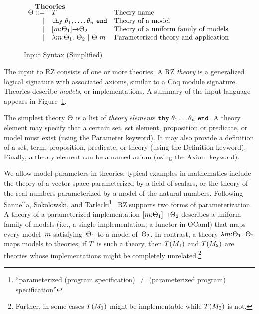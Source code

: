 \begin{figure}
\[\begin{array}{rl@{\quad}l}
  		\noalign{\textbf{Theories}}
		\ith ::= 
		     & \iTH&\mbox{Theory name}\\
		   	| & \ithy{\ite_1,\ldots,\ite_n} &\mbox{Theory of a model}\\
		 	| & \idarrow{\iM}{\ith_1}{\ith_2} &\mbox{Theory of a uniform family of models}\\
		  	| & \ilambda{\iM}{\ith_1}{\ith_2} \ibar 
		      \iapp{\ith}{\iM}&\mbox{Parameterized theory and application}\\
	\end{array}
	\]
	\label{fig:input}
	\caption{Input Syntax (Simplified)}
\end{figure}
\fi %

The input to RZ consists of one or more theories.
A RZ \emph{theory} is a generalized logical signature with associated
axioms, similar to a Coq module signature. Theories describe
\emph{models}, or implementations. 
\iflong
A summary of the input language appears in Figure~\ref{fig:input}.
\fi %

The simplest theory $\Theta$ is a list of \emph{theory element}\/s
$\mathtt{thy}\ \theta_1 \ldots \theta_n\ \mathtt{end}$. A theory element may specify that a certain
set, set element, proposition or predicate, or model must exist (using
the 
\textsf{Parameter} keyword). It may also provide a definition
of a set, term, proposition, predicate, or theory (using the 
\textsf{Definition} keyword). Finally, a theory element can be
a named axiom (using the \textsf{Axiom} keyword).

We allow model parameters in theories; 
typical examples in mathematics include
the theory of a vector space parameterized by a field of scalars,
or the theory of the real numbers parameterized by a model of the
natural numbers.
\iflong
Following Sannella, Sokolowski, and 
Tarlecki\footnote{``parameterized (program specification) $\neq$ (parameterized program) specification''}~\cite{sannella92:_towar}
\fi %
RZ supports two forms of parameterization.  A theory of a parameterized implementation
$[m{:}\Theta_1]{\to}\Theta_2$ describes a uniform family of models (i.e.,
a single implementation; a functor in OCaml) that maps every
model~$m$ satisfying~$\Theta_1$ to a model of~$\Theta_2$.  In contrast,
a theory $\lambda m{:}\Theta_1.\ \Theta_2$
maps models to theories; if $T$ is such a theory, then
$T(M_1)$ and $T(M_2)$ are theories whose implementations might be completely unrelated.\iflong\footnote{
Further, in some cases $T(M_1)$ might be implementable while $T(M_2)$ is not.
}
\fi %


